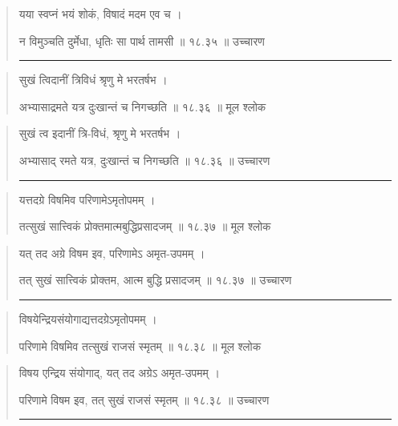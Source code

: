 \begin{quotation}
यया स्वप्नं भयं शोकं, विषादं मदम एव च ।  

न विमुञ्चति दुर्मेधा, धृतिः सा पार्थ तामसी  ॥ १८.३५ ॥  उच्चारण

\noindent\rule{16cm}{0.4pt} 
\end{quotation}


\begin{quotation}

सुखं त्विदानीं त्रिविधं श्रृणु मे भरतर्षभ ।  

अभ्यासाद्रमते यत्र दुःखान्तं च निगच्छति  ॥ १८.३६ ॥  मूल श्लोक
\end{quotation}

\begin{quotation}

सुखं त्व इदानीं त्रि-विधं, श्रृणु मे भरतर्षभ ।  

अभ्यासाद् रमते यत्र, दुःखान्तं च निगच्छति  ॥ १८.३६ ॥  उच्चारण

\noindent\rule{16cm}{0.4pt} 
\end{quotation}


\begin{quotation}

यत्तदग्रे विषमिव परिणामेऽमृतोपमम्‌ ।  

तत्सुखं सात्त्विकं प्रोक्तमात्मबुद्धिप्रसादजम्‌  ॥ १८.३७ ॥  मूल श्लोक
\end{quotation}

\begin{quotation}

यत् तद अग्रे विषम इव, परिणामेऽ अमृत-उपमम्‌ ।  

तत् सुखं सात्त्विकं प्रोक्तम, आत्म बुद्धि प्रसादजम्‌  ॥ १८.३७ ॥  उच्चारण

\noindent\rule{16cm}{0.4pt} 
\end{quotation}


\begin{quotation}

विषयेन्द्रियसंयोगाद्यत्तदग्रेऽमृतोपमम्‌ ।  

परिणामे विषमिव तत्सुखं राजसं स्मृतम्‌  ॥ १८.३८ ॥  मूल श्लोक
\end{quotation}

\begin{quotation}

विषय एन्द्रिय संयोगाद्, यत् तद अग्रेऽ अमृत-उपमम्‌ ।  

परिणामे विषम इव, तत् सुखं राजसं स्मृतम्‌  ॥ १८.३८ ॥  उच्चारण

\noindent\rule{16cm}{0.4pt} 
\end{quotation}


